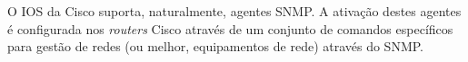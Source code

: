 \documentclass[../momento_1.tex]{subfiles}
\begin{document}
\par O IOS da Cisco suporta, naturalmente, agentes SNMP. A ativação destes agentes é configurada nos
\textit{routers} Cisco através de um conjunto de comandos específicos para gestão de redes (ou melhor, equipamentos de rede) através do SNMP.
\end{document}
